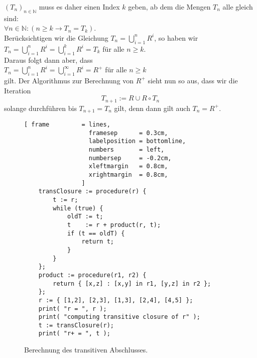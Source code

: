 $(T_n)_{n\in\mathbb{N}}$ muss es daher einen Index $k$ geben, ab dem die Mengen $T_n$ alle gleich sind:
\\[0.2cm]
\hspace*{1.3cm}
$\forall n \in \mathbb{N}:( n \geq k \rightarrow T_n = T_k)$.
\\[0.2cm]
Berücksichtigen wir die Gleichung $T_n = \bigcup_{i=1}^{n} R^i$, so haben wir 
\\[0.2cm]
\hspace*{1.3cm}
$T_n = \bigcup\limits_{i=1}^{n} R^i = \bigcup\limits_{i=1}^{k} R^i = T_k$ \quad für alle $n \geq k$.
\\[0.2cm]
Daraus folgt dann aber, dass
\\[0.2cm]
\hspace*{1.3cm}
$T_n = \bigcup\limits_{i=1}^{n} R^i = \bigcup\limits_{i=1}^{\infty} R^i = R^+$ 
\quad für alle $n \geq k$  
\\[0.2cm]
gilt.  Der Algorithmus zur Berechnung von $R^+$ sieht nun so aus, dass wir die Iteration
\[ T_{n+1} := R \cup R \circ T_n \]
solange durchführen bis $T_{n+1} = T_n$ gilt, denn dann gilt auch $T_n = R^+$.


\begin{figure}[!ht]
  \centering
\begin{Verbatim}[ frame         = lines, 
                  framesep      = 0.3cm, 
                  labelposition = bottomline,
                  numbers       = left,
                  numbersep     = -0.2cm,
                  xleftmargin   = 0.8cm,
                  xrightmargin  = 0.8cm,
                ]
    transClosure := procedure(r) {
        t := r;
        while (true) {
            oldT := t;
            t    := r + product(r, t);
            if (t == oldT) {
                return t;
            }
        }
    };
    product := procedure(r1, r2) {
        return { [x,z] : [x,y] in r1, [y,z] in r2 };
    };
    r := { [1,2], [2,3], [1,3], [2,4], [4,5] };
    print( "r = ", r );
    print( "computing transitive closure of r" );
    t := transClosure(r);
    print( "r+ = ", t );
\end{Verbatim} 
\vspace*{-0.3cm}
\caption{Berechnung des transitiven Abschlusses.}  
\label{fig:transitive-closure.stlx}
\end{figure} %

